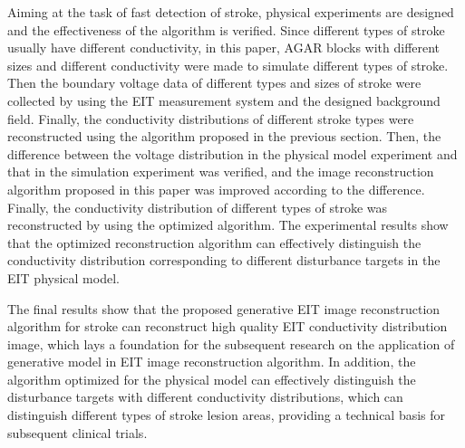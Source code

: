 \begin{englishabstract}
Aiming at the task of fast detection of stroke, physical experiments are designed and the effectiveness of the algorithm is verified.
Since different types of stroke usually have different conductivity,  in this paper, 
AGAR blocks with different sizes and different conductivity were made to simulate different types of stroke. 
Then the boundary voltage data of different types and sizes of stroke were collected by using the EIT measurement system and the designed 
background field. Finally, the conductivity distributions of different stroke types were reconstructed using the algorithm proposed in the previous section.
Then, the difference between the voltage distribution in the physical model experiment and that in the simulation experiment was verified, and the image reconstruction algorithm proposed in this paper was improved according to the difference. Finally, the conductivity distribution of different types of stroke was reconstructed by using the optimized algorithm.
The experimental results show that the optimized reconstruction algorithm can effectively distinguish the conductivity distribution corresponding to different disturbance targets in the EIT physical model.

The final results show that the proposed generative EIT image reconstruction algorithm for stroke can reconstruct high quality EIT conductivity distribution image,
which lays a foundation for the subsequent research on the application of generative model in EIT image reconstruction algorithm.
In addition, the algorithm optimized for the physical model can effectively distinguish the disturbance targets with different conductivity distributions, 
which can distinguish different types of stroke lesion areas, providing a technical basis for subsequent clinical trials.





\end{englishabstract}